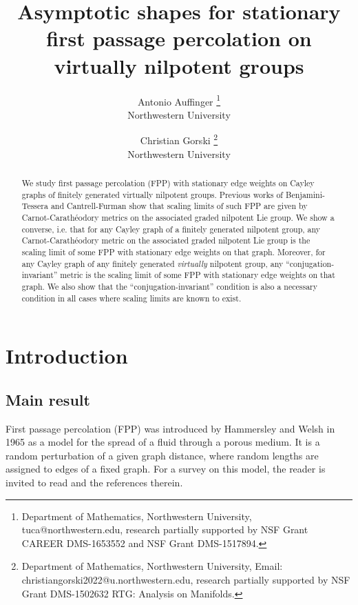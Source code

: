 \documentclass[12pt,reqno]{article}
\numberwithin{equation}{section}
\begin{document}
\author{Antonio Auffinger \thanks{Department of Mathematics, Northwestern University, tuca@northwestern.edu, research partially supported by NSF Grant CAREER DMS-1653552 and NSF Grant DMS-1517894.} \\
	\small{Northwestern University}\and Christian Gorski \thanks{Department of Mathematics, Northwestern University, Email: christiangorski2022@u.northwestern.edu, research partially supported by NSF Grant DMS-1502632
RTG: Analysis on Manifolds.}\\
	\small{Northwestern University}}
\title{Asymptotic shapes for stationary first passage percolation on virtually nilpotent groups}

\maketitle
\begin{abstract}
We study first passage percolation (FPP) with stationary edge weights on Cayley graphs of finitely generated virtually nilpotent groups.
Previous works of Benjamini-Tessera \cite{BenjaminiTessera} and Cantrell-Furman \cite{CantrellFurman} show that scaling limits of such FPP are given by 
Carnot-Carath\'eodory metrics on the associated graded nilpotent Lie group.
We show a converse, i.e. that for any Cayley graph of a finitely generated nilpotent group,
any Carnot-Carath\'eodory metric on the associated graded nilpotent Lie group is the scaling limit of some FPP with stationary
edge weights on that graph.
Moreover, for any Cayley graph of any finitely generated \emph{virtually} nilpotent group, 
any ``conjugation-invariant'' metric  is the scaling limit of some 
FPP with stationary edge weights on that graph.
We also show that the ``conjugation-invariant'' condition is also a necessary condition in all cases where scaling limits are known to exist.

\end{abstract}

\section{Introduction}
\subsection{Main result}

First passage percolation (FPP) was introduced by Hammersley and Welsh \cite{HW} in 1965  as a model for the spread of a fluid through a porous medium. It is a random perturbation of a given graph distance, where random lengths are assigned to edges of a fixed graph. For a survey on this model, the reader is invited to read \cite{Aspects, ADH} and the references therein. 
\end{document}
